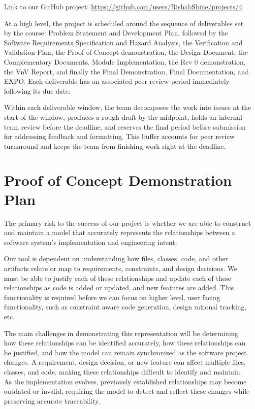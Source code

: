 \documentclass{article}
\begin{document}
Link to our GitHub project: \url{https://github.com/users/RishabShine/projects/4}

At a high level, the project is scheduled around the sequence of deliverables
set by the course: Problem Statement and Development Plan, followed by the
Software Requirements Specification and Hazard Analysis, the Verification and
Validation Plan, the Proof of Concept demonstration, the Design Document, the
Complementary Documents, Module Implementation, the Rev 0 demonstration, the
VnV Report, and finally the Final Demonstration, Final Documentation, and
EXPO. Each deliverable has an associated peer review period immediately
following its due date.

Within each deliverable window, the team decomposes the work into issues at
the start of the window, produces a rough draft by the midpoint, holds an
internal team review before the deadline, and reserves the final period
before submission for addressing feedback and formatting. This buffer
accounts for peer review turnaround and keeps the team from finishing work
right at the deadline.

\section{Proof of Concept Demonstration Plan}

The primary risk to the success of our project is whether we are able to construct and maintain a model that accurately represents the relationships between a software system’s implementation and engineering intent.

Our tool is dependent on understanding how files, classes, code, and other artifacts relate or map to requirements, constraints, and design decisions. We must be able to justify each of these relationships and update each of these relationships as code is added or updated, and new features are added. This functionality is required before we can focus on higher level, user facing functionality, such as constraint aware code generation, design rational tracking, etc.

The main challenges in demonstrating this representation will be determining how these relationships can be identified accurately, how these relationships can be justified, and how the model can remain synchronized as the software project changes. A requirement, design decision, or new feature can affect multiple files, classes, and code, making these relationships difficult to identify and maintain. As the implementation evolves, previously established relationships may become outdated or invalid, requiring the model to detect and reflect these changes while preserving accurate traceability.
\end{document}
